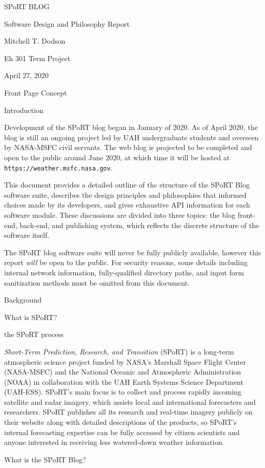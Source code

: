 SPoRT BLOG

Software Design and Philosophy Report

Mitchell T. Dodson

Eh 301 Term Project

April 27, 2020

Front Page Concept

Introduction

Development of the SPoRT blog began in January of 2020. As of April 2020, the blog is still an ongoing project led by UAH undergraduate students and overseen by NASA-MSFC civil servants. The web blog is projected to be completed and open to the public around June 2020, at which time it will be hosted at \texttt{https://weather.msfc.nasa.gov}.

This document provides a detailed outline of the structure of the SPoRT Blog software suite, describes the design principles and philosophies that informed choices made by its developers, and gives exhaustive API information for each software module. These discussions are divided into three topics: the blog front-end, back-end, and publishing system, which reflects the discrete structure of the software itself.

The SPoRT blog software suite will never be fully publicly available, however this report \textit{will} be open to the public. For security reasons, some details including internal network information, fully-qualified directory paths, and input form sanitization methods must be omitted from this document.

Background

What is SPoRT?

the SPoRT process

\textit{Short-Term Prediction, Research, and Transition} (SPoRT) is a long-term atmospheric science project funded by NASA's Marshall Space Flight Center (NASA-MSFC) and the National Oceanic and Atmospheric Administration (NOAA) in collaboration with the UAH Earth Systems Science Department (UAH-ESS). SPoRT's main focus is to collect and process rapidly incoming satellite and radar imagery, which assists local and international forecasters and researchers. SPoRT publishes all its research and real-time imagery publicly on their website \cite{SPoRT_RTD20} along with detailed descriptions of the products, so SPoRT's internal forecasting expertise can be fully accessed by citizen scientists and anyone interested in receiving less watered-down weather information.

What is the SPoRT Blog?

